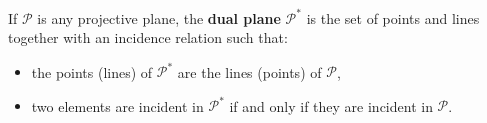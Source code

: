 If $\mathcal{P}$ is any projective plane, the \textbf{dual plane} $\mathcal{P}^*$ is the set of points and lines together with an incidence relation such that:
\begin{itemize}
  \item the points (lines) of $\mathcal{P}^*$ are the lines (points) of $\mathcal{P}$,
  \item two elements are incident in $\mathcal{P}^*$ if and only if they are incident in $\mathcal{P}$.
\end{itemize}
